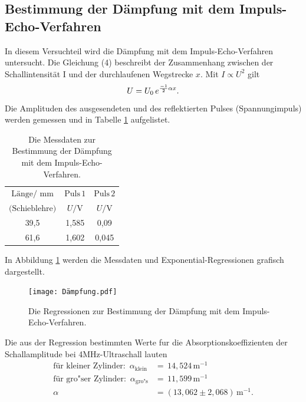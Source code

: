 \subsection{Bestimmung der Dämpfung mit dem Impuls-Echo-Verfahren}
In diesem Versuchteil wird die Dämpfung mit dem Impuls-Echo-Verfahren untersucht. Die Gleichung (4) beschreibt der Zusammenhang zwischen der Schallintensität I und der
durchlaufenen Wegstrecke $x$.
Mit $I \propto U^2$ gilt 
\begin{equation}
  U= U_0\, e^{\frac{-1}{2}\alpha x}.\\
   \end{equation}
Die Amplituden des ausgesendeten und des reflektierten Pulses (Spannungimpuls) werden gemessen und in Tabelle \ref{tab:Dmpfung} aufgelistet.
\begin{table}[H]
    \centering
    \caption{Die Messdaten zur Bestimmung der Dämpfung mit dem Impuls-Echo-Verfahren.}
    \label{tab:Dmpfung}
    \begin{tabular}{| c | c |c|}
    \hline
    $\text{Länge/ mm} $ &$\text{Puls}\, 1$ & $\text{Puls}\, 2$\\
   $\text{(Schieblehre)}$& $U/\text{V}$ & $U/\text{V}$ \\
    \hline
    39,5& 1,585&0,09\\
    61,6&1,602&0,045\\
    \hline
\end{tabular}
\end{table}
\noindent
 In Abbildung \ref{fig:Dämpfung} werden die Messdaten und Exponential-Regressionen grafisch dargestellt.
 \begin{figure}[H]
    \centering
    \texttt{[image: Dämpfung.pdf]}
    \caption{Die Regressionen zur Bestimmung der Dämpfung mit dem Impuls-Echo-Verfahren.}
    \label{fig:Dämpfung}
  \end{figure}
  \noindent
Die aus der Regression bestimmten
Werte fur die Absorptionskoeffizienten der Schallamplitude  bei 4MHz-Ultraschall lauten 
\begin{align*}
    \text{für kleiner Zylinder}:\,\, \alpha_{\text{klein}} &=\, 14,524\,\text{m}^{-1}\\
    \text{für gro"ser Zylinder}:\,\, \alpha_{\text{gro"s}} &=\, 11,599 \,\text{m}^{-1}\\
     \alpha &=(13,062\pm2,068)\, \text{m}^{-1}.\\
 \end{align*}

